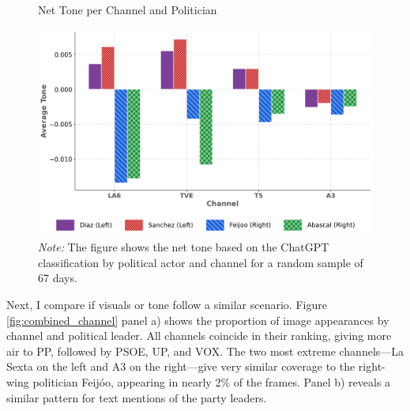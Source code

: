 \documentclass[12pt]{article}
\begin{document}
\begin{figure}[htbp!]
	\caption{Net Tone per Channel and Politician}
	\centering
	\includegraphics[width=150mm]{figures/politicians_tone_proportions}
	\caption*{\small \textit{Note:} The figure shows the net tone based on the ChatGPT classification by political actor and channel for a random sample of 67 days. }
	\label{fig:tone_channel}
\end{figure}





Next, I compare if visuals or tone follow a similar scenario. Figure \ref{fig:combined_channel} panel a) shows the proportion of image appearances by channel and political leader. All channels coincide in their ranking, giving more air to PP, followed by PSOE, UP, and VOX. The two most extreme channels—La Sexta on the left and A3 on the right—give very similar coverage to the right-wing politician Feijóo, appearing in nearly 2\% of the frames. Panel b)  reveals a similar pattern for text mentions of the party leaders.
\end{document}
